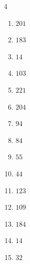 \begin{multicols}{4}
\begin{enumerate}

\columnbreak %

  \item $201$


  \item $183$


  \item $14$


  \item $103$


  \item $221$


  \item $204$


  \item $94$


  \item $84$


  \item $55$


  \item $44$


  \item $123$


  \item $109$


  \item $184$


  \item $14$


  \item $32$



\end{enumerate}
\end{multicols}
